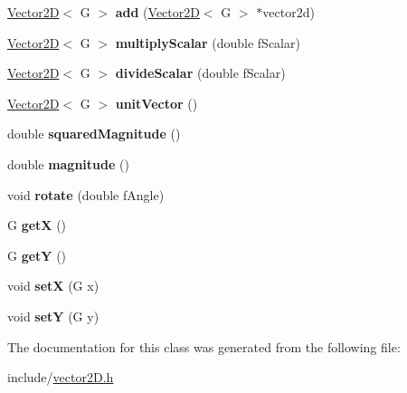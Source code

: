 \begin{DoxyCompactItemize}
\item 
\hypertarget{class_vector2_d_a2c65e6b82fc1879c564850a6f212a588}{}\hyperlink{class_vector2_d}{Vector2\+D}$<$ G $>$ {\bfseries add} (\hyperlink{class_vector2_d}{Vector2\+D}$<$ G $>$ $\ast$vector2d)\label{class_vector2_d_a2c65e6b82fc1879c564850a6f212a588}

\item 
\hypertarget{class_vector2_d_a0dcbc4d12ccef65bf193a52d92fe13b7}{}\hyperlink{class_vector2_d}{Vector2\+D}$<$ G $>$ {\bfseries multiply\+Scalar} (double f\+Scalar)\label{class_vector2_d_a0dcbc4d12ccef65bf193a52d92fe13b7}

\item 
\hypertarget{class_vector2_d_ab87df45d2980f3702f349d2ac7970801}{}\hyperlink{class_vector2_d}{Vector2\+D}$<$ G $>$ {\bfseries divide\+Scalar} (double f\+Scalar)\label{class_vector2_d_ab87df45d2980f3702f349d2ac7970801}

\item 
\hypertarget{class_vector2_d_a1a734dd9f1ca01a88bac3f6bf2be97d0}{}\hyperlink{class_vector2_d}{Vector2\+D}$<$ G $>$ {\bfseries unit\+Vector} ()\label{class_vector2_d_a1a734dd9f1ca01a88bac3f6bf2be97d0}

\item 
\hypertarget{class_vector2_d_af4162d18ba5939bd0175ae01ad6f0221}{}double {\bfseries squared\+Magnitude} ()\label{class_vector2_d_af4162d18ba5939bd0175ae01ad6f0221}

\item 
\hypertarget{class_vector2_d_aab76e76bb642784480bdd231b90b1273}{}double {\bfseries magnitude} ()\label{class_vector2_d_aab76e76bb642784480bdd231b90b1273}

\item 
\hypertarget{class_vector2_d_a85f594928169b9c4bb74cc26ab43d111}{}void {\bfseries rotate} (double f\+Angle)\label{class_vector2_d_a85f594928169b9c4bb74cc26ab43d111}

\item 
\hypertarget{class_vector2_d_a46521876fbb0b52881eba97a074ba59c}{}G {\bfseries get\+X} ()\label{class_vector2_d_a46521876fbb0b52881eba97a074ba59c}

\item 
\hypertarget{class_vector2_d_ac0ecf6cdb4b8106b8c1c2a08efc728df}{}G {\bfseries get\+Y} ()\label{class_vector2_d_ac0ecf6cdb4b8106b8c1c2a08efc728df}

\item 
\hypertarget{class_vector2_d_a6c5526343de1af297d3cc4baca03a9b1}{}void {\bfseries set\+X} (G x)\label{class_vector2_d_a6c5526343de1af297d3cc4baca03a9b1}

\item 
\hypertarget{class_vector2_d_ac7ba076a26efb04c2e590a0cdd3fd20e}{}void {\bfseries set\+Y} (G y)\label{class_vector2_d_ac7ba076a26efb04c2e590a0cdd3fd20e}

\end{DoxyCompactItemize}


The documentation for this class was generated from the following file\+:\begin{DoxyCompactItemize}
\item 
include/\hyperlink{vector2_d_8h}{vector2\+D.\+h}\end{DoxyCompactItemize}
